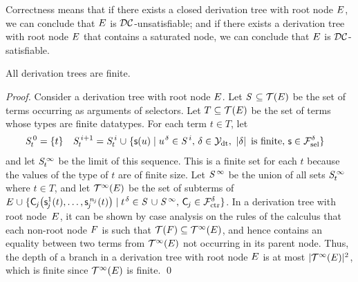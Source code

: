 Correctness means that if there exists a closed derivation tree with root node
$E$, we can conclude that $E$ is $\mathcal{DC}$-unsatisfiable; and if there exists
a derivation tree with root node $E$ that contains a saturated node, we can
conclude that $E$ is $\mathcal{DC}$-satisfiable.

\begin{theorem}[Termination]%
\label{thm:t}%
\afterDot
All derivation trees are finite.
\end{theorem}
\begin{proof}
Consider a derivation tree with root node $E$.
Let $\SSS \subseteq \tEc$ be the set of terms occurring as arguments of selectors.
Let $T \subseteq \mathcal{T}(E)$ be the set of terms whose types are finite datatypes.
For each term $t \in T$\negvthinspace,
let
\begin{align*}
\smash{\SSSS 0_t} & = \{ t \}
& \smash{\SSSS {i+1}_t} & = \smash{\SSSS i_t \mathrel\cup \{ \const s( u ) \mid u\typ{\delta} \in \SSSS i{,}~ \delta \in \Data{,}~ \left|\delta\right| \text{ is finite}{,}~ \const{s} \in \Sel^{\delta}}  \}
\end{align*}
and let $\mathit{S}^{\,\infty}_t$ be the limit of this sequence.
This is a finite set for each $t$ because the values of the type of $t$ are of finite size.
Let $\mathit{S}^{\,\infty}$ be the union of all sets $\mathit{S}^{\,\infty}_t$ where $t \in T$,
and let $\mathcal{T}^\infty(E)$ be the set of subterms of $\Ec \mathrel\cup \{ \const C_{\negvthinspace j}\bigl( \const s^1_{\negvthinspace j}( t ), \ldots, \const s^{\smash{\,n_{\negvthinspace j}}}_{\negvthinspace j}( t ) \bigr) \mid t\typ{\delta} \in \SSS \mathrel\cup \SSSS \AST{,}~ \const C_{\negvthinspace j} \in \Ctr^\delta \}$.
In a derivation tree with root node~$E$,
it can be shown by case analysis on the rules of the calculus that each non-root node $F$ is such that
$\mathcal{T}(F) \subseteq \mathcal{T}^\infty(E)$, and hence contains an equality between two terms from $\mathcal{T}^\infty(E)$ not occurring in its parent node.
Thus, the depth of a branch in a derivation tree with root node $E$ is at most $\left| \smash{\mathcal{T}^\infty(E)}\vphantom{X} \right|{\!}^2$,
which is finite since $\mathcal{T}^\infty(E)$ is finite.
\qed
\end{proof}

